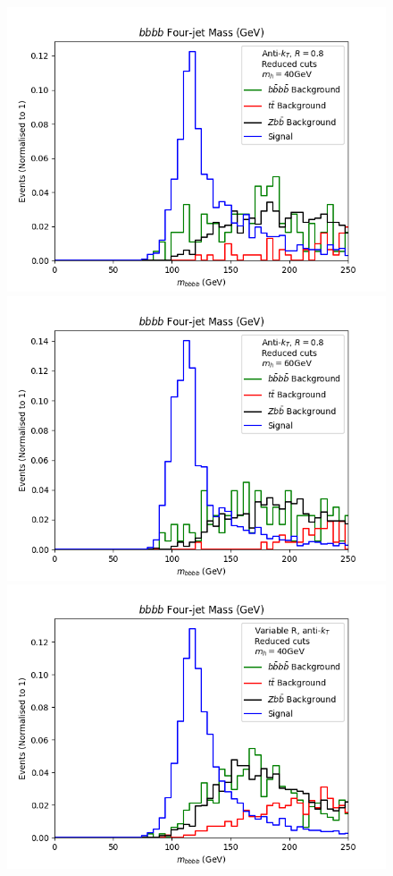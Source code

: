 \documentclass[12pt]{article}
\begin{document}
\begin{figure}[t!]
    \includegraphics[scale=0.5]{plots/Background/bbbb_mass_40gev_AK8.png}
    \includegraphics[scale=0.5]{plots/Background/bbbb_mass_60gev_AK8.png}
    \includegraphics[scale=0.5]{plots/Background/bbbb_mass_40gev_rho20.png}

\end{figure}
\end{document}
